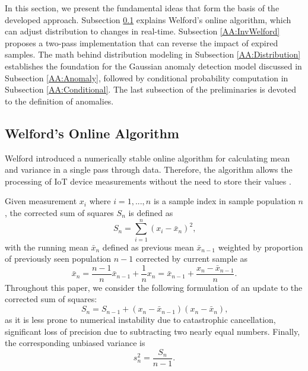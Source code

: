 In this section, we present the fundamental ideas that form the basis of the developed approach. Subsection \ref{AA:Welford} explains Welford's online algorithm, which can adjust distribution to changes in real-time. Subsection \ref{AA:InvWelford} proposes a two-pass implementation that can reverse the impact of expired samples. The math behind distribution modeling in Subsection \ref{AA:Distribution} establishes the foundation for the Gaussian anomaly detection model discussed in Subsection \ref{AA:Anomaly}, followed by conditional probability computation in Subsection \ref{AA:Conditional}. The last subsection of the preliminaries is devoted to the definition of anomalies.

\subsection{Welford's Online Algorithm}\label{AA:Welford}
Welford introduced a numerically stable online algorithm for calculating mean and variance in a single pass through data. Therefore, the algorithm allows the processing of IoT device measurements without the need to store their values \citep{Wel62}.

Given measurement \(x_i\) where \(i=1,...,n\) is a sample index in sample population \(n\), the corrected sum of squares \(S_n\) is defined as
\begin{equation}
  S_n = \sum_{i=1}^n (x_i - \bar x_n)^2\text{,}\label{eq:sumsquares}
\end{equation}
with the running mean \(\bar x_n\) defined as previous mean \(\bar x_{n-1}\) weighted by proportion of previously seen population \(n-1\) corrected by current sample as
\begin{equation}
  \bar x_n = \frac{n-1}{n} \bar x_{n-1} + \frac{1}{n}x_n = \bar x_{n-1} + \frac{x_n - \bar x_{n-1}}{n}\text{.}\label{eq:runmean}
\end{equation}
Throughout this paper, we consider the following formulation of an update to the corrected sum of squares:
\begin{equation}
  S_n = S_{n-1} + (x_n - \bar x_{n-1})(x_n - \bar x_n)\text{,}\label{eq:upsumsquares}
\end{equation}
as it is less prone to numerical instability due to catastrophic cancellation, significant loss of precision due to subtracting two nearly equal numbers. Finally, the corresponding unbiased variance is
\begin{equation}
  s^2_n = \frac{S_{n}}{n-1}\text{.}\label{eq:runvar}
\end{equation}

